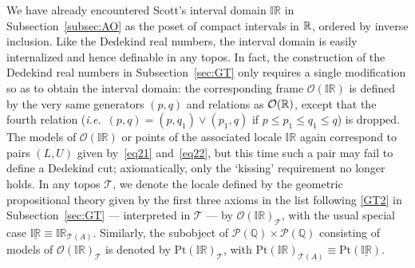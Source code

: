 \documentclass[11pt]{article}
\newcommand{\IR}{\mathbb{IR}}
\newcommand{\Q}{\mathbb{Q}}
\newcommand{\x}{\times} \newcommand{\hb}{\hbar}
\newcommand{\er}{\eqref}
\newcommand{\CO}{{\mathcal O}} \newcommand{\CP}{{\mathcal P}}
\newcommand{\CT}{{\mathcal T}} \newcommand{\CV}{{\mathcal V}}
\newcommand{\alg}[1]{\ensuremath{#1}}
\newcommand{\asstopos}{\ensuremath{\mathcal{T}}}
\newcommand{\TA}{\mathcal{T}(A)}
\newcommand{\ie}{\textit{i.e.}}
\renewcommand{\TA}{\asstopos(\alg{A})}
\begin{document}
We have already encountered Scott's interval domain $\IR$ in
Subsection~\ref{subsec:AO} as the poset of compact intervals in ${\mathbb R}$,
ordered by inverse inclusion. Like the Dedekind real numbers, the interval
domain is easily internalized and hence definable in any topos. In
fact, the construction of the Dedekind real numbers in
Subsection~\ref{sec:GT} only requires a single modification so as to
obtain the interval domain: the corresponding frame  $\CO(\IR)$ is
defined by the very same generators $(p,q)$ and relations as
$\CO(\R)$, except that the fourth relation (\ie\ $(p,q)=(p,q_1)\vee (p_1,q)$ if $p\leqslant p_1\leqslant q_1\leqslant q$)
is dropped. The models of
$\CO(\IR)$ or points of the associated locale $\IR$ again correspond
to pairs $(L,U)$ given by~\er{eq21} and~\er{eq22}, but this time such
a pair may fail to define a Dedekind
cut; axiomatically, only the `kissing' requirement no longer holds.
In any topos $\CT$, we denote the locale defined by the geometric propositional  theory given by 
the first three axioms in the list following \er{GT2}   in
Subsection~\ref{sec:GT} --- interpreted in $\CT$ --- by $\CO(\IR)_{\CT}$, with the usual special case $\underline{\IR}\equiv\IR_{\TA}$. 
Similarly, the  subobject of $\CP(\Q)\x\CP(\Q)$
consisting of models  of $\CO(\IR)_{\CT}$ is denoted by
$\mathrm{Pt}(\IR)_{\CT}$, with $\mathrm{Pt}(\IR)_{\TA}\equiv \mathrm{Pt}(\underline{\IR})$.
\end{document}
